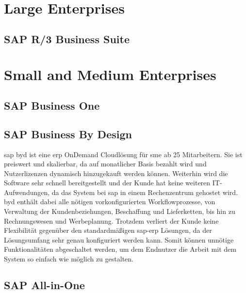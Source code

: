 \section{Large Enterprises}
\subsection{SAP R/3 Business Suite}
\label{sec:business-suite}

\section{Small and Medium Enterprises}
\subsection{SAP Business One}
\label{sec:business-one}

\subsection{SAP Business By Design}
\label{sec:byd}

\gls{sap} \gls{byd} ist eine \gls{erp} OnDemand Cloudlösung für \gls{sme} ab 25 Mitarbeitern. Sie ist preiswert und skalierbar, da auf monatlicher Basis bezahlt wird und Nutzerlizenzen dynamisch hinzugekauft werden können. Weiterhin wird die Software sehr schnell bereitgestellt und der Kunde hat keine weiteren IT-Aufwendungen, da das System bei \gls{sap} in einem Rechenzentrum gehostet wird. \gls{byd} enthält dabei alle nötigen vorkonfigurierten Workflowprozesse, von Verwaltung der Kundenbeziehungen, Beschaffung und Lieferketten, bis hin zu Rechnungswesen und Werbeplanung. Trotzdem verliert der Kunde keine Flexibilität gegenüber den standardmäßigen \gls{sap}-\gls{erp} Lösungen, da der Lösungsumfang sehr genau konfiguriert werden kann. Somit können unnötige Funktionalitäten abgeschaltet werden, um dem Endnutzer die Arbeit mit dem System so einfach wie möglich zu gestalten.

\subsection{SAP All-in-One}
\label{sec:allinone}

